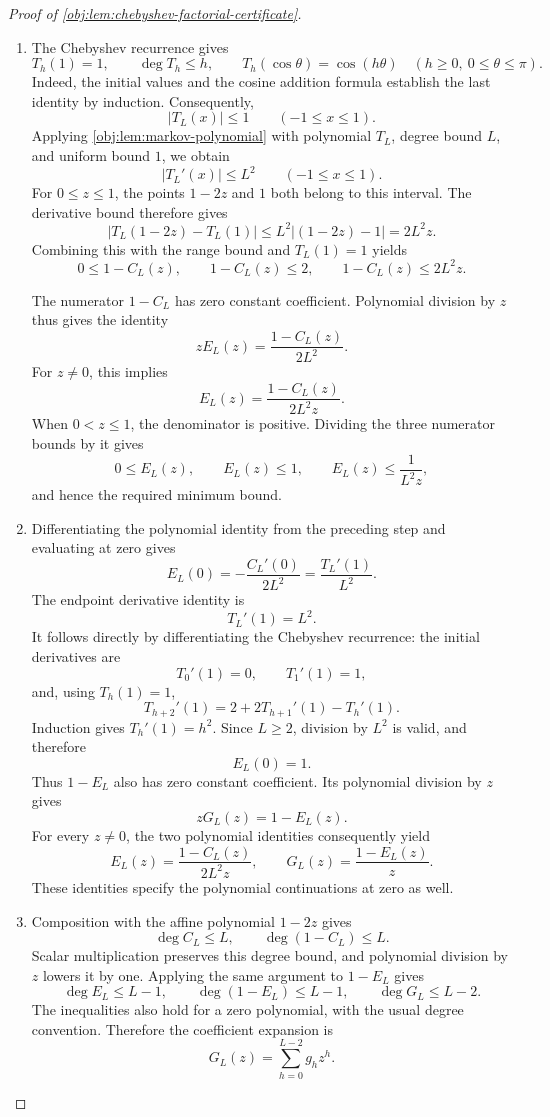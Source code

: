 \documentclass[11pt]{article}
\begin{document}
\begin{proof}[Proof of \cref{obj:lem:chebyshev-factorial-certificate}]
\begin{enumerate}
\item The Chebyshev recurrence gives
\[
T_h(1)=1,\qquad \deg T_h\le h,\qquad
T_h(\cos\theta)=\cos(h\theta)
\quad(h\ge0,\ 0\le\theta\le\pi).
\]
Indeed, the initial values and the cosine addition formula establish the last identity by induction. Consequently,
\[
|T_L(x)|\le1\qquad(-1\le x\le1).
\]
Applying \cref{obj:lem:markov-polynomial} with polynomial \(T_L\), degree bound \(L\), and uniform bound \(1\), we obtain
\[
|T_L'(x)|\le L^2\qquad(-1\le x\le1).
\]
For \(0\le z\le1\), the points \(1-2z\) and \(1\) both belong to this interval. The derivative bound therefore gives
\[
|T_L(1-2z)-T_L(1)|\le L^2|(1-2z)-1|=2L^2z.
\]
Combining this with the range bound and \(T_L(1)=1\) yields
\[
0\le1-C_L(z),\qquad
1-C_L(z)\le2,\qquad
1-C_L(z)\le2L^2z.
\]

The numerator \(1-C_L\) has zero constant coefficient. Polynomial division by \(z\) thus gives the identity
\[
zE_L(z)=\frac{1-C_L(z)}{2L^2}.
\]
For \(z\ne0\), this implies
\[
E_L(z)=\frac{1-C_L(z)}{2L^2z}.
\]
When \(0<z\le1\), the denominator is positive. Dividing the three numerator bounds by it gives
\[
0\le E_L(z),\qquad
E_L(z)\le1,\qquad
E_L(z)\le\frac{1}{L^2z},
\]
and hence the required minimum bound.

\item Differentiating the polynomial identity from the preceding step and evaluating at zero gives
\[
E_L(0)=-\frac{C_L'(0)}{2L^2}
      =\frac{T_L'(1)}{L^2}.
\]
The endpoint derivative identity is
\[
T_L'(1)=L^2.
\]
It follows directly by differentiating the Chebyshev recurrence: the initial derivatives are
\[
T_0'(1)=0,\qquad T_1'(1)=1,
\]
and, using \(T_h(1)=1\),
\[
T_{h+2}'(1)=2+2T_{h+1}'(1)-T_h'(1).
\]
Induction gives \(T_h'(1)=h^2\). Since \(L\ge2\), division by \(L^2\) is valid, and therefore
\[
E_L(0)=1.
\]
Thus \(1-E_L\) also has zero constant coefficient. Its polynomial division by \(z\) gives
\[
zG_L(z)=1-E_L(z).
\]
For every \(z\ne0\), the two polynomial identities consequently yield
\[
E_L(z)=\frac{1-C_L(z)}{2L^2z},
\qquad
G_L(z)=\frac{1-E_L(z)}{z}.
\]
These identities specify the polynomial continuations at zero as well.

\item Composition with the affine polynomial \(1-2z\) gives
\[
\deg C_L\le L,\qquad \deg(1-C_L)\le L.
\]
Scalar multiplication preserves this degree bound, and polynomial division by \(z\) lowers it by one. Applying the same argument to \(1-E_L\) gives
\[
\deg E_L\le L-1,\qquad
\deg(1-E_L)\le L-1,\qquad
\deg G_L\le L-2.
\]
The inequalities also hold for a zero polynomial, with the usual degree convention. Therefore the coefficient expansion is
\[
G_L(z)=\sum_{h=0}^{L-2}g_hz^h.
\]


\end{enumerate}
\end{proof}
\end{document}
